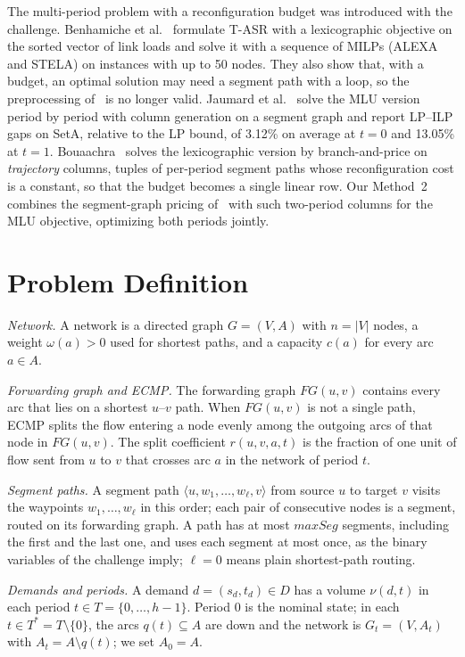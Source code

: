 \documentclass[conference]{IEEEtran}
\begin{document}
The multi-period problem with a reconfiguration budget was introduced with the challenge. Benhamiche et al.~\cite{benhamiche2026} formulate T-ASR with a lexicographic objective on the sorted vector of link loads and solve it with a sequence of MILPs (ALEXA and STELA) on instances with up to 50 nodes. They also show that, with a budget, an optimal solution may need a segment path with a loop, so the preprocessing of~\cite{callebaut2023} is no longer valid. Jaumard et al.~\cite{jaumard2026} solve the MLU version period by period with column generation on a segment graph and report LP--ILP gaps on SetA, relative to the LP bound, of 3.12\% on average at $t=0$ and 13.05\% at $t=1$. Bouaachra~\cite{bouaachra2026} solves the lexicographic version by branch-and-price on \emph{trajectory} columns, tuples of per-period segment paths whose reconfiguration cost is a constant, so that the budget becomes a single linear row. Our Method~2 combines the segment-graph pricing of~\cite{cg4sr,jaumard2026} with such two-period columns for the MLU objective, optimizing both periods jointly.

\section{Problem Definition}\label{sec:problem}

\emph{Network.} A network is a directed graph $G=(V,A)$ with $n=|V|$ nodes, a weight $\omega(a)>0$ used for shortest paths, and a capacity $c(a)$ for every arc $a\in A$.

\emph{Forwarding graph and ECMP.} The forwarding graph $FG(u,v)$ contains every arc that lies on a shortest $u$--$v$ path. When $FG(u,v)$ is not a single path, ECMP splits the flow entering a node evenly among the outgoing arcs of that node in $FG(u,v)$. The split coefficient $r(u,v,a,t)$ is the fraction of one unit of flow sent from $u$ to $v$ that crosses arc $a$ in the network of period $t$.

\emph{Segment paths.} A segment path $\langle u,w_1,\dots,w_\ell,v\rangle$ from source $u$ to target $v$ visits the waypoints $w_1,\dots,w_\ell$ in this order; each pair of consecutive nodes is a segment, routed on its forwarding graph. A path has at most $maxSeg$ segments, including the first and the last one, and uses each segment at most once, as the binary variables of the challenge imply; $\ell=0$ means plain shortest-path routing.

\emph{Demands and periods.} A demand $d=(s_d,t_d)\in D$ has a volume $\nu(d,t)$ in each period $t\in T=\{0,\dots,h-1\}$. Period 0 is the nominal state; in each $t\in T^*=T\setminus\{0\}$, the arcs $q(t)\subseteq A$ are down and the network is $G_t=(V,A_t)$ with $A_t=A\setminus q(t)$; we set $A_0=A$.
\end{document}
